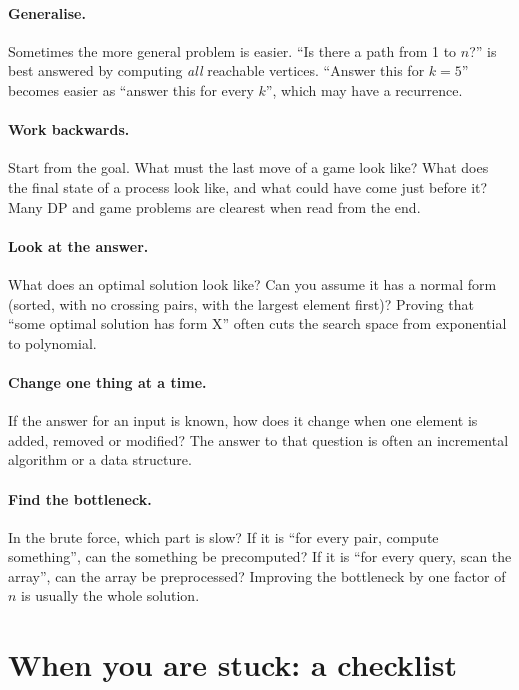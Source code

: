 \paragraph{Generalise.} Sometimes the more general problem is easier. ``Is there a path from 1 to $n$?'' is best answered by
computing \emph{all} reachable vertices. ``Answer this for $k = 5$'' becomes easier as ``answer this for every $k$'', which
may have a recurrence.

\paragraph{Work backwards.} Start from the goal. What must the last move of a game look like? What does the final state of a
process look like, and what could have come just before it? Many DP and game problems are clearest when read from the end.

\paragraph{Look at the answer.} What does an optimal solution look like? Can you assume it has a normal form (sorted, with no
crossing pairs, with the largest element first)? Proving that ``some optimal solution has form X'' often cuts the search
space from exponential to polynomial.

\paragraph{Change one thing at a time.} If the answer for an input is known, how does it change when one element is added,
removed or modified? The answer to that question is often an incremental algorithm or a data structure.

\paragraph{Find the bottleneck.} In the brute force, which part is slow? If it is ``for every pair, compute something'', can
the something be precomputed? If it is ``for every query, scan the array'', can the array be preprocessed? Improving the
bottleneck by one factor of $n$ is usually the whole solution.

\section[When you are stuck]{When you are stuck: a checklist \hfill \silver}\label{sec:stuck}

